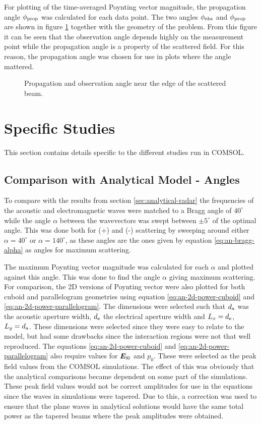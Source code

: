 \documentclass[11pt,twoside]{eitExjobb}
\begin{document}
	For plotting of the time-averaged Poynting vector magnitude, the propagation angle $\phi_{\mathrm{prop}}$ was calculated for each data point. The two angles $\phi_{\mathrm{obs}}$ and $\phi_{\mathrm{prop}}$ are shown in figure \ref{fig:sim-postproc-angles} together with the geometry of the problem. From this figure it can be seen that the observation angle depends highly on the measurement point while the propagation angle is a property of the scattered field. For this reason, the propagation angle was chosen for use in plots where the angle mattered.
	
	\begin{figure}[h]
		\centering
		
		\caption{\label{fig:sim-postproc-angles} Propagation and observation angle near the edge of the scattered beam.}
	\end{figure}
	
	\section{Specific Studies}
	This section contains details specific to the different studies run in COMSOL.
		
	\subsection{Comparison with Analytical Model - Angles}
	To compare with the results from section \ref{sec:analytical-radar} the frequencies of the acoustic and electromagnetic waves were matched to a Bragg angle of $40^\circ$ while the angle $\alpha$ between the wavevectors was swept between $\pm 5^\circ$ of the optimal angle. This was done both for (+) and (-) scattering by sweeping around either $\alpha = 40^\circ$ or $\alpha = 140^\circ$, as these angles are the ones given by equation \eqref{eq:an-bragg-alpha} as angles for maximum scattering.
	
	The maximum Poynting vector magnitude was calculated for each $\alpha$ and plotted against this angle. This was done to find the angle $\alpha$ giving maximum scattering. For comparison, the 2D versions of Poynting vector were also plotted for both cuboid and parallelogram geometries using equation \eqref{eq:an-2d-power-cuboid} and \eqref{eq:an-2d-power-parallelogram}. The dimensions were selected such that $d_{\mathrm{a}}$ was the acoustic aperture width, $d_{\mathrm{e}}$ the electrical aperture width and $L_x = d_{\mathrm{e}}$, $L_y = d_{\mathrm{a}}$. These dimensions were selected since they were easy to relate to the model, but had some drawbacks since the interaction regions were not that well reproduced. The equations \eqref{eq:an-2d-power-cuboid} and \eqref{eq:an-2d-power-parallelogram} also require values for $\bm{E}_{\mathrm{i0}}$ and $p_0$. These were selected as the peak field values from the COMSOL simulations. The effect of this was obviously that the analytical comparisons became dependent on some part of the simulations. These peak field values would not be correct amplitudes for use in the equations since the waves in simulations were tapered. Due to this, a correction was used to ensure that the plane waves in analytical solutions would have the same total power as the tapered beams where the peak amplitudes were obtained. 
	
\end{document}
